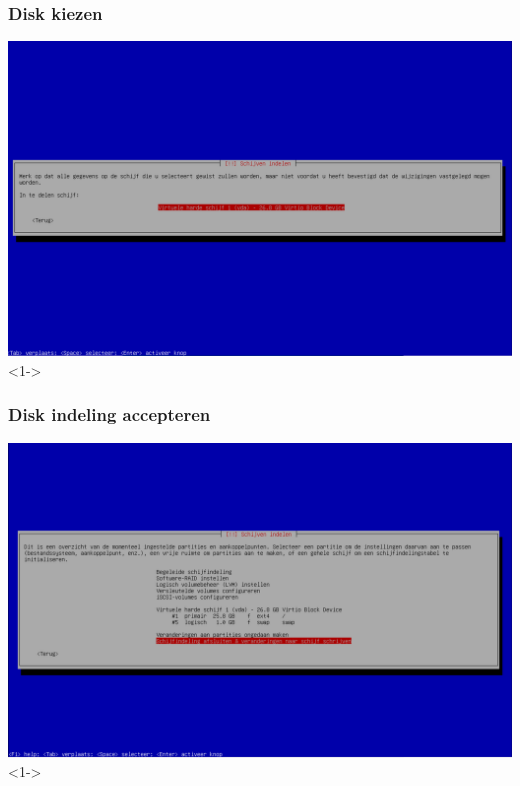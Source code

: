\documentclass{beamer}
\begin{document}
\begin{frame}
  \frametitle{Disk kiezen}
  \centering
  \includegraphics[width=\textwidth]{img/disk-kiezen.png}<1->
\end{frame}

\begin{frame}
   \frametitle{Disk indeling accepteren}
   \centering
   \includegraphics[width=\textwidth]{img/indeling-accepteren.png}<1->
\end{frame}
\end{document}
